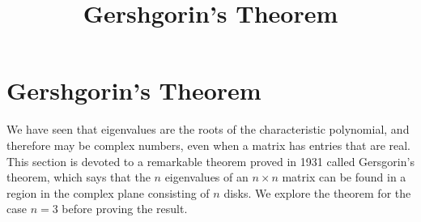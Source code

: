 \documentclass{ximera}
\title{Gershgorin's Theorem} \license{CC BY-NC-SA 4.0}
\begin{document}
\begin{abstract}
\end{abstract}
\maketitle

\section*{Gershgorin's Theorem}
We have seen that eigenvalues are the roots of the characteristic polynomial, and therefore may be complex numbers, even when a matrix has entries that are real.  This section is devoted to a remarkable theorem proved in 1931 called Gersgorin's theorem, which says that the $n$ eigenvalues of an $n \times n$ matrix can be found in a region in the complex plane consisting of $n$ disks.  We explore the theorem for the case $n=3$ before proving the result.  


\begin{exploration}\label{init:GershDisks3x3}


\begin{center}
\end{center}

\end{exploration}
\end{document}
